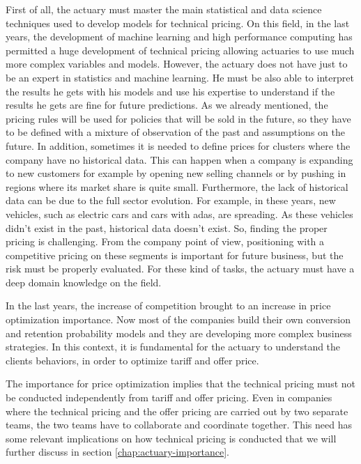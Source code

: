 \documentclass[a4paper, twoside, openright, 12pt]{report}
\theoremstyle{definition}
\theoremstyle{definition}
\theoremstyle{definition}
\theoremstyle{remark}
\begin{document}
First of all, the actuary must master the main statistical and data science techniques used to develop models for technical pricing. On this field, in the last years, the development of machine learning and high performance computing has permitted a huge development of technical pricing allowing actuaries to use much more complex variables and models. However, the actuary does not have just to be an expert in statistics and machine learning. He must be also able to interpret the results he gets with his models and use his expertise to understand if the results he gets are fine for future predictions. As we already mentioned, the pricing rules will be used for policies that will be sold in the future, so they have to be defined with a mixture of observation of the past and assumptions on the future. In addition, sometimes it is needed to define prices for clusters where the company have no historical data. This can happen when a company is expanding to new customers for example by opening new selling channels or by pushing in regions where its market share is quite small. Furthermore, the lack of historical data can be due to the full sector evolution. For example, in these years, new vehicles, such as electric cars and cars with \ac{adas}, are spreading. As these vehicles didn't exist in the past, historical data doesn't exist. So, finding the proper pricing is challenging. From the company point of view, positioning with a competitive pricing on these segments is important for future business, but the risk must be properly evaluated. For these kind of tasks, the actuary must have a deep domain knowledge on the field.

In the last years, the increase of competition brought to an increase in price optimization importance. Now most of the companies build their own conversion and retention probability models and they are developing more complex business strategies. In this context, it is fundamental for the actuary to understand the clients behaviors, in order to optimize tariff and offer price.

The importance for price optimization implies that the technical pricing must not be conducted independently from tariff and offer pricing. Even in companies where the technical pricing and the offer pricing are carried out by two separate teams, the two teams have to collaborate and coordinate together. This need has some relevant implications on how technical pricing is conducted that we will further discuss in section \ref{chap:actuary-importance}.
\end{document}
